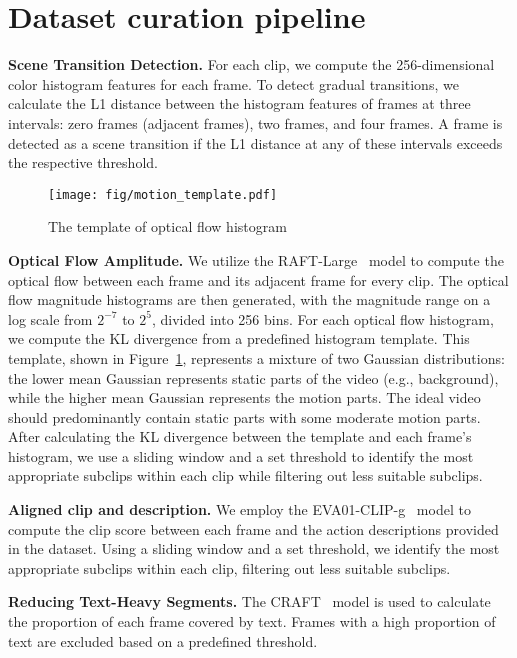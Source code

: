 \section{Dataset curation pipeline}

\label{appendix data}
\textbf{Scene Transition Detection.} For each clip, we compute the 256-dimensional color histogram features for each frame. To detect gradual transitions, we calculate the L1 distance between the histogram features of frames at three intervals: zero frames (adjacent frames), two frames, and four frames. A frame is detected as a scene transition if the L1 distance at any of these intervals exceeds the respective threshold.

\begin{figure}[h]
  \centering
   \texttt{[image: fig/motion\_template.pdf]}
   \caption{The template of optical flow histogram}
   \label{fig:motion}
\end{figure}

\textbf{Optical Flow Amplitude.} We utilize the RAFT-Large~\cite{raft} model to compute the optical flow between each frame and its adjacent frame for every clip. The optical flow magnitude histograms are then generated, with the magnitude range on a log scale from \(2^{-7}\) to \(2^5\), divided into 256 bins. For each optical flow histogram, we compute the KL divergence from a predefined histogram template. This template, shown in Figure~\ref{fig:motion}, represents a mixture of two Gaussian distributions: the lower mean Gaussian represents static parts of the video (e.g., background), while the higher mean Gaussian represents the motion parts. The ideal video should predominantly contain static parts with some moderate motion parts. After calculating the KL divergence between the template and each frame's histogram, we use a sliding window and a set threshold to identify the most appropriate subclips within each clip while filtering out less suitable subclips.

\textbf{Aligned clip and description.} We employ the EVA01-CLIP-g~\cite{evaclip} model to compute the clip score between each frame and the action descriptions provided in the dataset. Using a sliding window and a set threshold, we identify the most appropriate subclips within each clip, filtering out less suitable subclips.

\textbf{Reducing Text-Heavy Segments.} The CRAFT~\cite{craft} model is used to calculate the proportion of each frame covered by text. Frames with a high proportion of text are excluded based on a predefined threshold.

